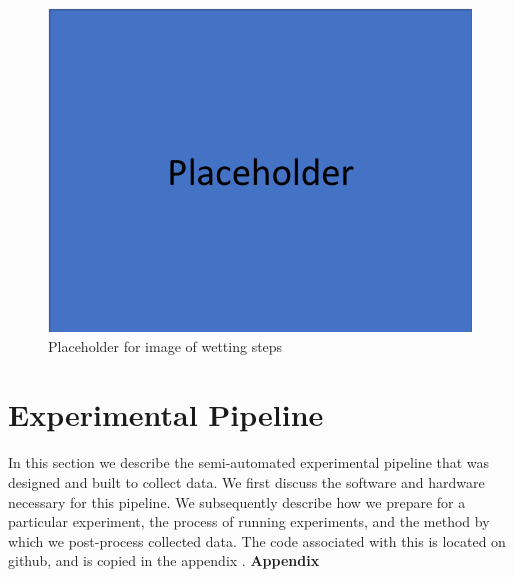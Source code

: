\begin{figure}[htpb]
    \begin{center}
    \includegraphics[width=0.3\linewidth]{Chapter2/Figs/Raster/placeholder.png}
    \caption{Placeholder for image of wetting steps}\label{wet_steps}
    \end{center}
\end{figure}

\section{Experimental Pipeline}
In this section we describe the semi-automated experimental pipeline that was designed and built to collect data. We first discuss the software and hardware necessary for this pipeline. We subsequently describe how we prepare for a particular experiment, the process of running experiments, and the method by which we post-process collected data. The code associated with this is located on github, and is copied in the appendix \cite{Dibua2018DataCollect}. \textbf{Appendix}

